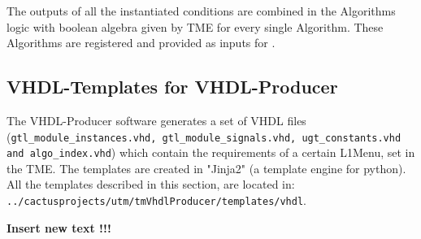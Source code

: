 The outputs of all the instantiated conditions are combined in the Algorithms logic with boolean algebra given by TME for every single Algorithm. These Algorithms are registered and provided
as inputs for \fdl.

\clearpage

\subsection{VHDL-Templates for VHDL-Producer}
\label{sec:gtl:templates_tme}

The VHDL-Producer software generates a set of VHDL files (\texttt{gtl\_module\_instances.vhd, gtl\_module\_signals.vhd, ugt\_constants.vhd and algo\_index.vhd}) which contain the requirements
of a certain L1Menu, set in the TME. The templates are created in "Jinja2" (a template engine for python).
All the templates described in this section, are located in:\\\texttt{../cactusprojects/utm/tmVhdlProducer/templates/vhdl}.

\textbf{Insert new text !!!}

